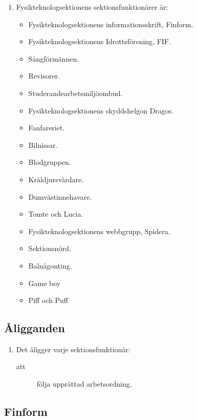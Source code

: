 \documentclass[11pt,a4paper]{article}
\begin{document}
\begin{enumerate}[\thesubsection .1]

  \item Fysikteknologsektionens sektionsfunktionärer är:
    \begin{itemize}
      \item Fysikteknologsektionens informationsskrift, Finform.
      \item Fysikteknologsektionens Idrottsförening, FIF.
      \item Sångförmännen.
      \item Revisorer.
      \item Studerandearbetsmiljöombud.
      \item Fysikteknologsektionens skyddshelgon Dragos.
      \item Fanfareriet.
      \item Bilnissar.
      \item Blodgruppen.
      \item Kräldjursvårdare.
      \item Dumvästinnehavare.
      \item Tomte och Lucia.
      \item Fysikteknologsektionens webbgrupp, Spidera.
      \item Sektionsnörd.
      \item Balnågonting.
      \item Game boy
      \item Piff och Puff 
    \end{itemize}

\end{enumerate}

\subsection{Åligganden}

\begin{enumerate}[\thesubsection .1]

  \item Det åligger varje sektionsfunktionär:
    \begin{description}
    \item[att] följa upprättad arbetsordning.
  
    \end{description}

\end{enumerate}

\subsection{Finform}
\end{document}
